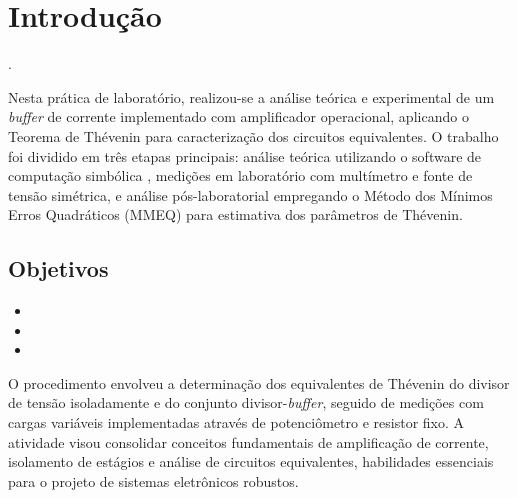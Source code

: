 \chapter{Introdução}

 \cite{nilsson}.


Nesta prática de laboratório, realizou-se a análise teórica e experimental de um \textit{buffer} de corrente implementado com amplificador operacional, aplicando o Teorema de Thévenin para caracterização dos circuitos equivalentes. O trabalho foi dividido em três etapas principais: análise teórica utilizando o software de computação simbólica \cite{maxima}, medições em laboratório com multímetro e fonte de tensão simétrica, e análise pós-laboratorial empregando o Método dos Mínimos Erros Quadráticos (MMEQ) para estimativa dos parâmetros de Thévenin.

\section{Objetivos}

\begin{itemize}
    \item 
    \item 
    \item 
\end{itemize}

O procedimento envolveu a determinação dos equivalentes de Thévenin do divisor de tensão isoladamente e do conjunto divisor-\textit{buffer}, seguido de medições com cargas variáveis implementadas através de potenciômetro e resistor fixo. A atividade visou consolidar conceitos fundamentais de amplificação de corrente, isolamento de estágios e análise de circuitos equivalentes, habilidades essenciais para o projeto de sistemas eletrônicos robustos.